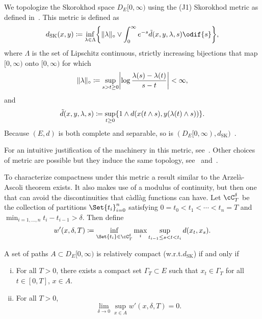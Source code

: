 We topologize the Skorokhod space \(D_E[0,\infty)\) using the (J1) Skorokhod metric as defined in~\cite[pp.116-117]{ethierMarkovProcessesCharacterization1985}.
This metric is defined as
\begin{equation}
  d_\mathrm{SK}(x,y) \coloneqq \inf_{\lambda \in \Lambda} \cbr*{ \norm{\lambda}_\circ \lor \int_0^\infty e^{-s} \tilde{d}(x,y,\lambda,s) \odif{s} },
\end{equation}
where \(\Lambda\) is the set of Lipschitz continuous, strictly increasing bijections that map \([0,\infty)\) onto \([0,\infty)\) for which
\begin{equation}
  \norm{\lambda}_\circ \coloneqq \sup_{s > t \geq 0} \abs*{ \log \frac{\lambda(s)-\lambda(t)}{s-t} } < \infty,
\end{equation}
and
\begin{equation}
  \tilde{d}(x,y,\lambda,s) \coloneqq \sup_{t \geq 0} \{ 1 \land d(x(t \land s), y(\lambda(t) \land s)) \}.
\end{equation}
Because \((E, d)\) is both complete and separable, so is \((D_E[0,\infty), d_\mathrm{SK})\)~\cite[Theorem 3.5.6]{ethierMarkovProcessesCharacterization1985}.

For an intuitive justification of the machinery in this metric, see~\cite{kernSkorokhodTopologiesWhat2024}.
Other choices of metric are possible but they induce the same topology, see~\cite[pp.166-168]{billingsleyConvergenceProbabilityMeasures1999} and~\cite[p.122-123]{pollardConvergenceStochasticProcesses1984}.

To characterize compactness under this metric a result similar to the Arzelà-Ascoli theorem exists.
It also makes use of a modulus of continuity, but then one that can avoid the discontinuities that càdlàg functions can have.
Let \(\cC_T^\delta\) be the collection of partitions \(\Set{t_i}_{i=0}^n\) satisfying \(0 = t_0 < t_1 < \cdots < t_n = T\) and \(\min_{i=1,\dots,n} t_i - t_{i-1} > \delta\).
Then define
\begin{equation}
  w'(x, \delta, T) \coloneqq \inf_{\Set{t_i} \in \cC_T^\delta} \max_i \sup_{t_{i-1} \leq s < t < t_i} d(x_t,x_s).
\end{equation}

\begin{theorem}\label{prelim:thm:rel-compact-in-SK}
  A set of paths \(A \subset D_E[0,\infty)\) is relatively compact (w.r.t.\@ \(d_\mathrm{SK}\)) if and only if
  \begin{enumerate}[(i)]
    \item For all \(T > 0\), there exists a compact set \(\Gamma_T \subset E\) such that \(x_t \in \Gamma_T\) for all \(t \in [0,T]\), \(x \in A\).
    \item For all \(T > 0\),
          \begin{equation}
            \lim_{\delta\to0} \sup_{x \in A} w'(x,\delta,T) = 0.
          \end{equation}
  \end{enumerate}
\end{theorem}

